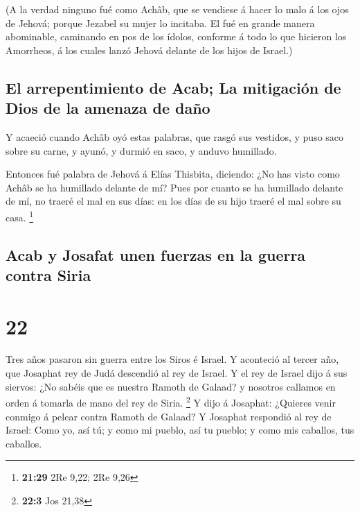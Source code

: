  (A la verdad ninguno fué como Achâb, que se vendiese á
hacer lo malo á los ojos de Jehová; porque Jezabel su mujer lo incitaba.
 El fué en grande manera abominable, caminando en pos de
los ídolos, conforme á todo lo que hicieron los Amorrheos, á los cuales
lanzó Jehová delante de los hijos de Israel.)

\hypertarget{el-arrepentimiento-de-acab-la-mitigaciuxf3n-de-dios-de-la-amenaza-de-dauxf1o}{%
\subsection{El arrepentimiento de Acab; La mitigación de Dios de la
amenaza de
daño}\label{el-arrepentimiento-de-acab-la-mitigaciuxf3n-de-dios-de-la-amenaza-de-dauxf1o}}

 Y acaeció cuando Achâb oyó estas palabras, que rasgó sus
vestidos, y puso saco sobre su carne, y ayunó, y durmió en saco, y
anduvo humillado.

 Entonces fué palabra de Jehová á Elías Thisbita,
diciendo:  ¿No has visto como Achâb se ha humillado
delante de mí? Pues por cuanto se ha humillado delante de mí, no traeré
el mal en sus días: en los días de su hijo traeré el mal sobre su casa.
\footnote{\textbf{21:29} 2Re 9,22; 2Re 9,26}

\hypertarget{acab-y-josafat-unen-fuerzas-en-la-guerra-contra-siria}{%
\subsection{Acab y Josafat unen fuerzas en la guerra contra
Siria}\label{acab-y-josafat-unen-fuerzas-en-la-guerra-contra-siria}}

\hypertarget{section-21}{%
\section{22}\label{section-21}}

 Tres años pasaron sin guerra entre los Siros é Israel.
 Y aconteció al tercer año, que Josaphat rey de Judá
descendió al rey de Israel.  Y el rey de Israel dijo á sus
siervos: ¿No sabéis que es nuestra Ramoth de Galaad? y nosotros callamos
en orden á tomarla de mano del rey de Siria. \footnote{\textbf{22:3} Jos
  21,38}  Y dijo á Josaphat: ¿Quieres venir conmigo á
pelear contra Ramoth de Galaad? Y Josaphat respondió al rey de Israel:
Como yo, así tú; y como mi pueblo, así tu pueblo; y como mis caballos,
tus caballos.

